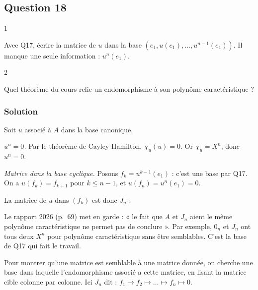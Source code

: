 \documentclass[11pt,a4paper]{article}
\newcommand{\equationajustee}[1]{%
  \sbox{\boiteequation}{$\displaystyle #1$}%
  \ifdim\wd\boiteequation>\linewidth
    \[\resizebox{\linewidth}{!}{\usebox{\boiteequation}}\]%
  \else
    \[#1\]%
  \fi}
\begin{document}
\hypertarget{question-18}{%
\subsection{Question 18}\label{question-18}}

\begin{indication}{1}

Avec Q17, écrire la matrice de \(u\) dans la base \((e_1,u(e_1),\dots,u^{n-1}(e_1))\). Il manque une seule information : \(u^n(e_1)\).

\end{indication}

\begin{indication}{2}

Quel théorème du cours relie un endomorphisme à son polynôme caractéristique ?

\end{indication}

\hypertarget{solution-17}{%
\subsubsection{Solution}\label{solution-17}}

Soit \(u\) associé à \(A\) dans la base canonique.

\emph{\(u^n=0\).} Par le théorème de Cayley-Hamilton, \(\chi_u(u)=0\). Or \(\chi_u=X^n\), donc \(u^n=0\).

\emph{Matrice dans la base cyclique.} Posons \(f_k=u^{k-1}(e_1)\) : c'est une base par Q17. On a \(u(f_k)=f_{k+1}\) pour \(k\le n-1\), et \(u(f_n)=u^n(e_1)=0\).

La matrice de \(u\) dans \((f_k)\) est donc \(J_n\) :
\equationajustee{\boxed{A\text{ est semblable \text{à} }J_n.}}

\begin{piege}

Le rapport 2026 (p.~69) met en garde : « le fait que \(A\) et \(J_n\) aient le même polynôme caractéristique ne permet pas de conclure ». Par exemple, \(0_n\) et \(J_n\) ont tous deux \(X^n\) pour polynôme caractéristique sans être semblables. C'est la base de Q17 qui fait le travail.

\end{piege}

\begin{methode}

Pour montrer qu'une matrice est semblable à une matrice donnée, on cherche une base dans laquelle l'endomorphisme associé a cette matrice, en lisant la matrice cible colonne par colonne. Ici \(J_n\) dit : \(f_1\mapsto f_2\mapsto\dots\mapsto f_n\mapsto0\).

\end{methode}
\end{document}
